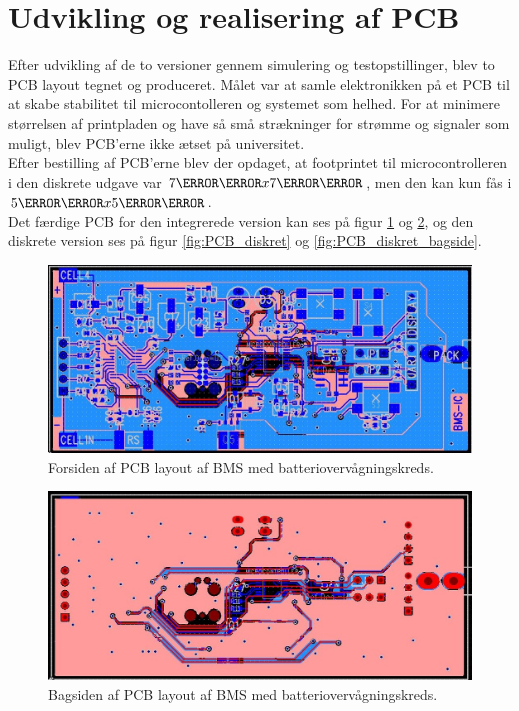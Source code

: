 \section{Udvikling og realisering af PCB}
Efter udvikling af de to versioner gennem simulering og testopstillinger, blev to PCB layout tegnet og produceret. Målet var at samle elektronikken på et PCB til at skabe stabilitet til microcontolleren og systemet som helhed. For at minimere størrelsen af printpladen og have så små strækninger for strømme og signaler som muligt, blev PCB'erne ikke ætset på universitet.
\\

Efter bestilling af PCB'erne blev der opdaget, at footprintet til microcontrolleren i den diskrete udgave var $7\milli\meter x 7\milli\meter$, men den kan kun fås i $5\milli\meter x 5\milli\meter$.
\\

Det færdige PCB for den integrerede version kan ses på figur \ref{fig:PCB_IC} og \ref{fig:PCB_IC_bagside}, og den diskrete version ses på figur \ref{fig:PCB_diskret} og \ref{fig:PCB_diskret_bagside}.

\begin{figure}[h]
	\centering
	\includegraphics[width=15cm]{billeder/IC_1.jpg}
	\caption{Forsiden af PCB layout af BMS med batteriovervågningskreds.}
	\label{fig:PCB_IC}
\end{figure}

\begin{figure}[h]
	\centering
	\includegraphics[width=15cm]{billeder/IC_2.jpg}
	\caption{Bagsiden af PCB layout af BMS med batteriovervågningskreds.}
	\label{fig:PCB_IC_bagside}
\end{figure}

